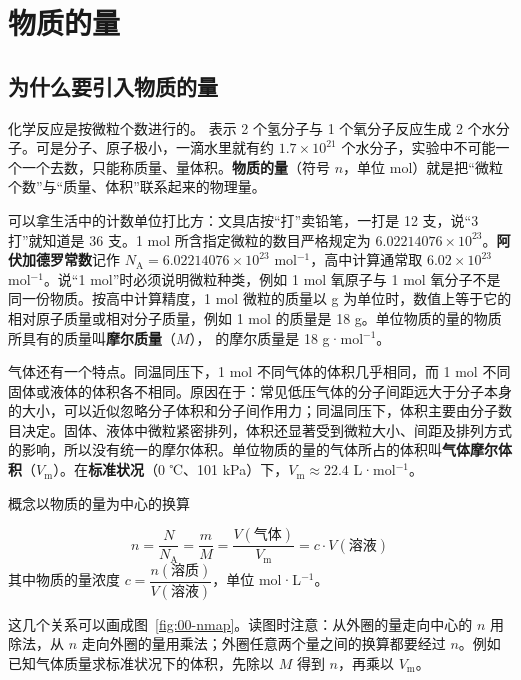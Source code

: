 \documentclass[UTF8,a4paper,zihao=5,oneside,openany,fontset=none]{ctexbook}
\def\heiti{\CJKfamily{zhhei}}
\newcommand{\textheading}[2]{\par\addvspace{.6em}\Needspace{4\baselineskip}\noindent
 {\heiti\if\relax\detokenize{#2}\relax #1\else #2\fi}\par\nobreak\smallskip\nobreak\color{black}\ignorespaces}
\newenvironment{gainian}[1][]{\textheading{概念}{#1}}{\par\smallskip}
\begin{document}
\section{物质的量}

\subsection{为什么要引入物质的量}
化学反应是按微粒个数进行的。 表示 2 个氢分子与 1 个氧分子反应生成 2 个水分子。可是分子、原子极小，一滴水里就有约 $1.7\times10^{21}$ 个水分子，实验中不可能一个一个去数，只能称质量、量体积。\textbf{物质的量}（符号 $n$，单位 mol）就是把“微粒个数”与“质量、体积”联系起来的物理量。

可以拿生活中的计数单位打比方：文具店按“打”卖铅笔，一打是 12 支，说“3 打”就知道是 36 支。1 mol 所含指定微粒的数目严格规定为 $6.02214076\times10^{23}$。\textbf{阿伏加德罗常数}记作 $N_\text{A}=6.02214076\times10^{23}$ mol$^{-1}$，高中计算通常取 $6.02\times10^{23}$ mol$^{-1}$。说“1 mol”时必须说明微粒种类，例如 1 mol 氧原子与 1 mol 氧分子不是同一份物质。按高中计算精度，1 mol 微粒的质量以 g 为单位时，数值上等于它的相对原子质量或相对分子质量，例如 1 mol  的质量是 18 g。单位物质的量的物质所具有的质量叫\textbf{摩尔质量}（$M$）， 的摩尔质量是 18 g·mol$^{-1}$。

气体还有一个特点。同温同压下，1 mol 不同气体的体积几乎相同，而 1 mol 不同固体或液体的体积各不相同。原因在于：常见低压气体的分子间距远大于分子本身的大小，可以近似忽略分子体积和分子间作用力；同温同压下，体积主要由分子数目决定。固体、液体中微粒紧密排列，体积还显著受到微粒大小、间距及排列方式的影响，所以没有统一的摩尔体积。单位物质的量的气体所占的体积叫\textbf{气体摩尔体积}（$V_\text{m}$）。在\textbf{标准状况}（0 ℃、101 kPa）下，$V_\text{m}\approx22.4$ L·mol$^{-1}$。

\begin{gainian}[以物质的量为中心的换算]
\[n=\frac{N}{N_\text{A}}=\frac{m}{M}=\frac{V(\text{气体})}{V_\text{m}}=c\cdot V(\text{溶液})\]
其中物质的量浓度 $c=\dfrac{n(\text{溶质})}{V(\text{溶液})}$，单位 mol·L$^{-1}$。
\end{gainian}

这几个关系可以画成图~\ref{fig:00-nmap}。读图时注意：从外圈的量走向中心的 $n$ 用除法，从 $n$ 走向外圈的量用乘法；外圈任意两个量之间的换算都要经过 $n$。例如已知气体质量求标准状况下的体积，先除以 $M$ 得到 $n$，再乘以 $V_\text{m}$。
\end{document}

